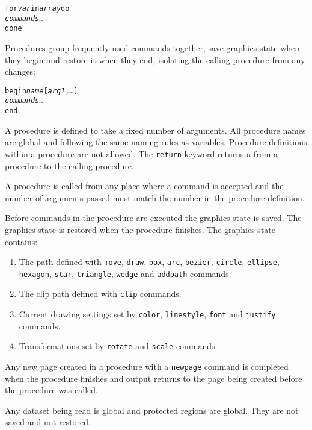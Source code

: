 \begin{alltt}
for \textit{var} in \textit{array} do
  \textit{commands} \dots
done
\end{alltt}

Procedures group frequently used commands together, save
graphics state when they begin and restore it when they end,
isolating the calling procedure from any changes:

\begin{alltt}
begin \textit{name} [\textit{arg1}, \dots]
  \textit{commands} \dots
end
\end{alltt}

A procedure is defined to take a fixed number of arguments.
All procedure names are global and following the same naming
rules as variables.
Procedure definitions within a procedure are not allowed.
The \texttt{return} keyword returns a
from a procedure to the calling procedure.

A procedure is called from any place where a command is accepted
and the number of arguments passed must match the number 
in the procedure definition.

Before commands in the procedure are executed
the graphics state is saved.
\label{graphicsstate}
The graphics state is restored when the procedure finishes.
The graphics state contains:

\begin{enumerate}
\item
The path defined with
\texttt{move},
\texttt{draw},
\texttt{box},
\texttt{arc},
\texttt{bezier},
\texttt{circle},
\texttt{ellipse},
\texttt{hexagon},
\texttt{star},
\texttt{triangle},
\texttt{wedge}
and
\texttt{addpath}
commands.

\item
The clip path defined with
\texttt{clip} commands.

\item
Current drawing settings set by
\texttt{color},
\texttt{linestyle},
\texttt{font} and \texttt{justify}
commands.

\item
Transformations set by \texttt{rotate} and \texttt{scale} commands.
\end{enumerate}

Any new page created in a procedure with a
\texttt{newpage}
command is completed when the procedure finishes and output
returns to the page being created before the procedure was called.

Any dataset being read is global and protected regions are global.
They are not saved and not restored.


